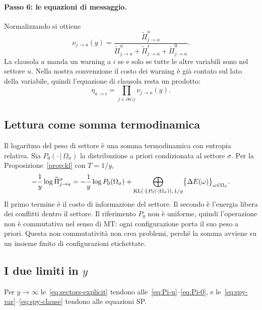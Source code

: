 \paragraph{Passo 6: le equazioni di messaggio.}
Normalizzando si ottiene
\begin{equation}
\nu_{j\to a}(y)=\frac{\widetilde\Pi^u_{j\to a}}{\widetilde\Pi^u_{j\to a}+\widetilde\Pi^s_{j\to a}+\widetilde\Pi^0_{j\to a}}.
\label{eq:spy-var}
\end{equation}
La clausola $a$ manda un warning a $i$ se e solo se tutte le altre variabili sono nel settore $u$.
Nella nostra convenzione il costo dei warning è già contato sul lato della variabile, quindi l'equazione di clausola resta un prodotto:
\begin{equation}
\eta_{a\to i}=\prod_{j\in\partial a\setminus i}\nu_{j\to a}(y).
\label{eq:spy-clause}
\end{equation}

\subsection{Lettura come somma termodinamica}

Il logaritmo del peso di settore è una somma termodinamica con entropia relativa.
Sia $P_0(\cdot\,|\,\Omega_\sigma)$ la distribuzione a priori condizionata al settore $\sigma$.
Per la Proposizione~\ref{prop:kl} con $T=1/y$,
\begin{equation}
-\frac1y\log\widetilde\Pi^\sigma_{j\to a}=-\frac1y\log P_0(\Omega_\sigma)+\bigoplus_{\mathrm{KL}(\cdot\|P_0(\cdot|\Omega_\sigma)),\,1/y}\bigl\{\Delta E(\omega)\bigr\}_{\omega\in\Omega_\sigma}.
\label{eq:sector-kl}
\end{equation}
Il primo termine è il costo di informazione del settore.
Il secondo è l'energia libera dei conflitti dentro il settore.
Il riferimento $P_0$ non è uniforme, quindi l'operazione non è commutativa nel senso di MT: ogni configurazione porta il suo peso a priori.
Questa non commutatività non crea problemi, perché la somma avviene su un insieme finito di configurazioni etichettate.

\subsection{I due limiti in $y$}

\begin{proposizione}
\label{prop:y-infty}
Per $y\to\infty$ le~\eqref{eq:sectors-explicit} tendono alle~\eqref{eq:Pi-u}--\eqref{eq:Pi-0}, e le~\eqref{eq:spy-var}--\eqref{eq:spy-clause} tendono alle equazioni SP.
\end{proposizione}

